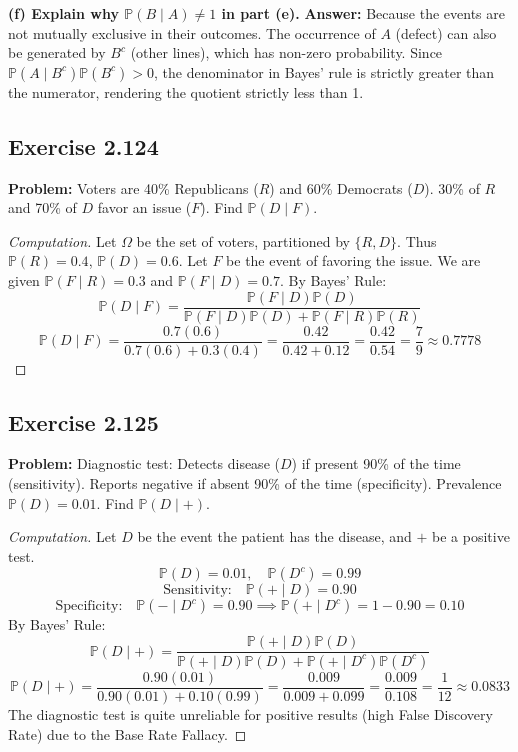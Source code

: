 \documentclass[12pt]{article}
\theoremstyle{definition}
\theoremstyle{remark}
\newcommand{\Pbb}{\mathbb{P}}
\newcommand{\OmegaSet}{\Omega}
\begin{document}
\textbf{(f) Explain why $\Pbb(B \mid A) \neq 1$ in part (e).}
\textbf{Answer:} Because the events are not mutually exclusive in their outcomes. The occurrence of $A$ (defect) can also be generated by $B^c$ (other lines), which has non-zero probability. Since $\Pbb(A \mid B^c)\Pbb(B^c) > 0$, the denominator in Bayes' rule is strictly greater than the numerator, rendering the quotient strictly less than 1.

\subsection*{Exercise 2.124}
\textbf{Problem:} Voters are 40\% Republicans ($R$) and 60\% Democrats ($D$). 30\% of $R$ and 70\% of $D$ favor an issue ($F$). Find $\Pbb(D \mid F)$.
\begin{proof}[Computation]
Let $\OmegaSet$ be the set of voters, partitioned by $\{R, D\}$. Thus $\Pbb(R) = 0.4$, $\Pbb(D) = 0.6$. Let $F$ be the event of favoring the issue. We are given $\Pbb(F \mid R) = 0.3$ and $\Pbb(F \mid D) = 0.7$.
By Bayes' Rule:
\[ \Pbb(D \mid F) = \frac{\Pbb(F \mid D)\Pbb(D)}{\Pbb(F \mid D)\Pbb(D) + \Pbb(F \mid R)\Pbb(R)} \]
\[ \Pbb(D \mid F) = \frac{0.7(0.6)}{0.7(0.6) + 0.3(0.4)} = \frac{0.42}{0.42 + 0.12} = \frac{0.42}{0.54} = \frac{7}{9} \approx 0.7778 \]
\end{proof}

\subsection*{Exercise 2.125}
\textbf{Problem:} Diagnostic test: Detects disease ($D$) if present 90\% of the time (sensitivity). Reports negative if absent 90\% of the time (specificity). Prevalence $\Pbb(D) = 0.01$. Find $\Pbb(D \mid +)$.
\begin{proof}[Computation]
Let $D$ be the event the patient has the disease, and $+$ be a positive test.
\[ \Pbb(D) = 0.01, \quad \Pbb(D^c) = 0.99 \]
\[ \text{Sensitivity:} \quad \Pbb(+ \mid D) = 0.90 \]
\[ \text{Specificity:} \quad \Pbb(- \mid D^c) = 0.90 \implies \Pbb(+ \mid D^c) = 1 - 0.90 = 0.10 \]
By Bayes' Rule:
\[ \Pbb(D \mid +) = \frac{\Pbb(+ \mid D)\Pbb(D)}{\Pbb(+ \mid D)\Pbb(D) + \Pbb(+ \mid D^c)\Pbb(D^c)} \]
\[ \Pbb(D \mid +) = \frac{0.90(0.01)}{0.90(0.01) + 0.10(0.99)} = \frac{0.009}{0.009 + 0.099} = \frac{0.009}{0.108} = \frac{1}{12} \approx 0.0833 \]
The diagnostic test is quite unreliable for positive results (high False Discovery Rate) due to the Base Rate Fallacy.
\end{proof}
\end{document}
